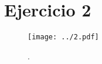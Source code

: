 \section*{Ejercicio 2}
\graphicspath{{/home/cabre/Desktop/Redes_Neuronales/Redes_Neuronales_IB/Practica_5/Figuras/}}


\begin{figure}
    \centering
    \texttt{[image: ../2.pdf]}
    \caption{.}
    \label{fig:02}
\end{figure}

